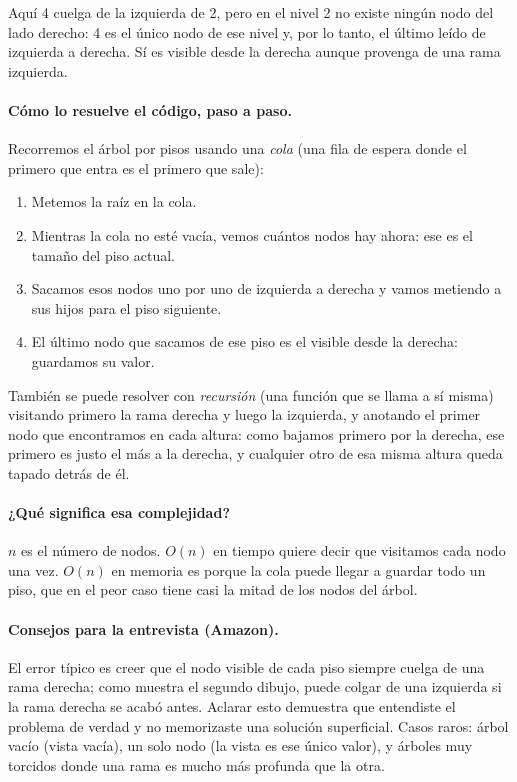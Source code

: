 \noindent Aquí 4 cuelga de la izquierda de 2, pero en el nivel 2 no existe
ningún nodo del lado derecho: 4 es el único nodo de ese nivel y, por lo
tanto, el último leído de izquierda a derecha. Sí es visible desde la
derecha aunque provenga de una rama izquierda.

\paragraph{Cómo lo resuelve el código, paso a paso.} Recorremos el árbol por
pisos usando una \emph{cola} (una fila de espera donde el primero que entra es
el primero que sale):
\begin{enumerate}
  \item Metemos la raíz en la cola.
  \item Mientras la cola no esté vacía, vemos cuántos nodos hay ahora: ese es el
        tamaño del piso actual.
  \item Sacamos esos nodos uno por uno de izquierda a derecha y vamos metiendo a
        sus hijos para el piso siguiente.
  \item El último nodo que sacamos de ese piso es el visible desde la derecha:
        guardamos su valor.
\end{enumerate}
También se puede resolver con \emph{recursión} (una función que se llama a sí
misma) visitando primero la rama derecha y luego la izquierda, y anotando el
primer nodo que encontramos en cada altura: como bajamos primero por la derecha,
ese primero es justo el más a la derecha, y cualquier otro de esa misma altura
queda tapado detrás de él.




\paragraph{¿Qué significa esa complejidad?} $n$ es el número de nodos. $O(n)$ en
tiempo quiere decir que visitamos cada nodo una vez. $O(n)$ en memoria es porque
la cola puede llegar a guardar todo un piso, que en el peor caso tiene casi la
mitad de los nodos del árbol.

\paragraph{Consejos para la entrevista (Amazon).} El error típico es creer que
el nodo visible de cada piso siempre cuelga de una rama derecha; como muestra el
segundo dibujo, puede colgar de una izquierda si la rama derecha se acabó antes.
Aclarar esto demuestra que entendiste el problema de verdad y no memorizaste una
solución superficial. Casos raros: árbol vacío (vista vacía), un solo nodo (la
vista es ese único valor), y árboles muy torcidos donde una rama es mucho más
profunda que la otra.
